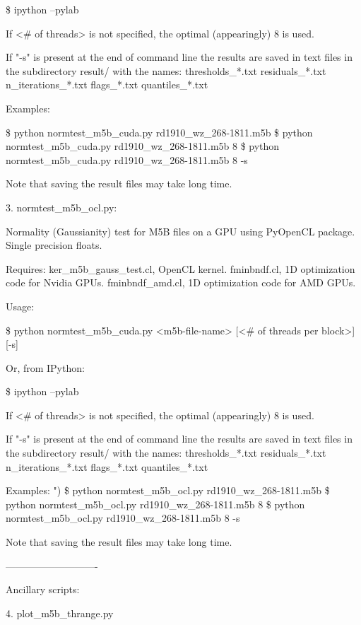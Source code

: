 \documentclass[letterpaper,twoside,12pt]{article}
\begin{document}
\$ ipython --pylab


If <# of threads> is not specified, the optimal (appearingly) 8 is used.

If "-s" is present at the end of command line the results are saved in text
files in the subdirectory result/ with the names:
   thresholds_*.txt
   residuals_*.txt
   n_iterations_*.txt
   flags_*.txt
   quantiles_*.txt

Examples:

\$ python normtest_m5b_cuda.py rd1910_wz_268-1811.m5b
\$ python normtest_m5b_cuda.py rd1910_wz_268-1811.m5b 8
\$ python normtest_m5b_cuda.py rd1910_wz_268-1811.m5b 8 -s

Note that saving the result files may take long time.




3. normtest_m5b_ocl.py:

Normality (Gaussianity) test for M5B files on a GPU using PyOpenCL package.
Single precision floats.

Requires:
ker_m5b_gauss_test.cl, OpenCL kernel.
fminbndf.cl, 1D optimization code for Nvidia GPUs.
fminbndf_amd.cl, 1D optimization code for AMD GPUs.

Usage: 

\$ python normtest_m5b_cuda.py <m5b-file-name> [<# of threads per block>] [-s]

Or, from IPython:

\$ ipython --pylab


If <# of threads> is not specified, the optimal (appearingly) 8 is used.

If "-s" is present at the end of command line the results are saved in text
files in the subdirectory result/ with the names:
   thresholds_*.txt
   residuals_*.txt
   n_iterations_*.txt
   flags_*.txt
   quantiles_*.txt

Examples:
")
\$ python normtest_m5b_ocl.py rd1910_wz_268-1811.m5b
\$ python normtest_m5b_ocl.py rd1910_wz_268-1811.m5b 8
\$ python normtest_m5b_ocl.py rd1910_wz_268-1811.m5b 8 -s

Note that saving the result files may take long time.


----------------------------

Ancillary scripts:

4. plot_m5b_thrange.py
\end{document}
